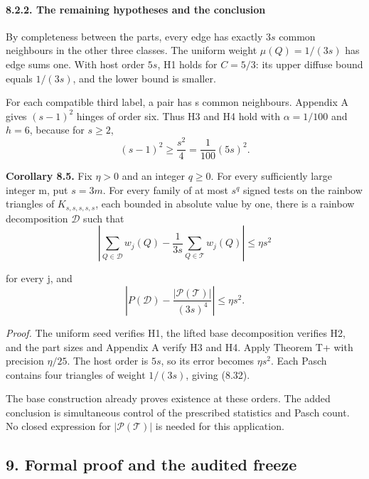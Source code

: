 \documentclass[english,11pt,a4paper]{article}
\begin{document}
\paragraph{8.2.2. The remaining hypotheses and the conclusion}\label{the-remaining-hypotheses-and-the-conclusion}

By completeness between the parts, every edge has exactly \(3s\) common neighbours in the other three classes. The uniform weight \(\mu(Q)=1/(3s)\) has edge sums one. With host order \(5s\), H1 holds for \(C=5/3\): its upper diffuse bound equals \(1/(3s)\), and the lower bound is smaller.

For each compatible third label, a pair has s common neighbours. Appendix A gives \((s-1)^2\) hinges of order six. Thus H3 and H4 hold with \(\alpha=1/100\) and \(h=6\), because for \(s\geq2\),
\[(s-1)^2\geq\frac{s^2}{4}=\frac1{100}(5s)^2.                        \tag{8.30}\]

\textbf{Corollary 8.5.} Fix \(\eta>0\) and an integer \(q\geq0\). For every sufficiently large integer m, put \(s=3m\). For every family of at most \(s^q\) signed tests on the rainbow triangles of \(K_{s,s,s,s,s}\), each bounded in absolute value by one, there is a rainbow decomposition \(\mathcal D\) such that
\[\left|\sum_{Q\in\mathcal D}w_j(Q)
-\frac1{3s}\sum_{Q\in\mathcal T}w_j(Q)\right|\leq\eta s^2          \tag{8.31}\]

for every j, and
\[\left|P(\mathcal D)-\frac{|\mathcal P(\mathcal T)|}{(3s)^4}\right|
\leq\eta s^2.                                                       \tag{8.32}\]

\emph{Proof.} The uniform seed verifies H1, the lifted base decomposition verifies H2, and the part sizes and Appendix A verify H3 and H4. Apply Theorem T+ with precision \(\eta/25\). The host order is \(5s\), so its error becomes \(\eta s^2\). Each Pasch contains four triangles of weight \(1/(3s)\), giving (8.32).

The base construction already proves existence at these orders. The added conclusion is simultaneous control of the prescribed statistics and Pasch count. No closed expression for \(|\mathcal P(\mathcal T)|\) is needed for this application.

\subsection{9. Formal proof and the audited freeze}\label{formal-proof-and-the-audited-freeze}
\end{document}
